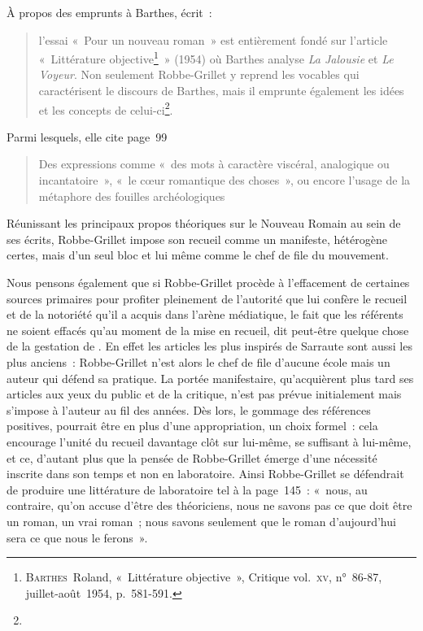 \documentclass[12pt, a4paper]{article}
\begin{document}
À propos des emprunts à Barthes, \galia{} écrit~:
\begin{quote}
l’essai «~Pour un nouveau roman~» est entièrement fondé sur l’article «~Littérature objective\footnote{\textsc{Barthes}~Roland, «~Littérature objective~», Critique vol.~\textsc{xv}, n°~86-87, juillet-août~1954, p.~581-591.}~» (1954) où Barthes analyse \textit{La Jalousie} et \textit{Le Voyeur}. Non seulement Robbe-Grillet y reprend les vocables qui caractérisent le discours de Barthes, mais il emprunte également les idées et les concepts de celui-ci\footnote{}.    
\end{quote}
Parmi lesquels, elle cite page~99
\begin{quote}
Des expressions comme «~des mots à caractère viscéral, analogique ou incantatoire~», «~le cœur romantique des choses~», ou encore l’usage de la métaphore des fouilles archéologiques
\end{quote}

Réunissant les principaux propos théoriques sur le Nouveau Romain au sein de ses écrits, Robbe-Grillet impose son recueil comme un manifeste, hétérogène certes, mais d'un seul bloc et lui même comme le chef de file du mouvement.










Nous pensons également que si Robbe-Grillet procède à l'effacement de certaines sources primaires pour profiter pleinement de l'autorité que lui confère le recueil et de la notoriété qu'il a acquis dans l'arène médiatique, le fait que les référents ne soient effacés qu'au moment de la mise en recueil, dit peut-être quelque chose de la gestation de \punr. En effet les articles les plus inspirés de Sarraute sont aussi les plus anciens~: Robbe-Grillet n'est alors le chef de file d'aucune école mais un auteur qui défend sa pratique. La portée manifestaire, qu'acquièrent plus tard ses articles aux yeux du public et de la critique, n'est pas prévue initialement mais s'impose à l'auteur au fil des années. Dès lors, le gommage des références positives, pourrait être en plus d'une appropriation, un choix formel~: cela encourage l'unité du recueil davantage clôt sur lui-même, se suffisant à lui-même, et ce, d'autant plus que la pensée de Robbe-Grillet émerge d'une nécessité inscrite dans son temps et non en laboratoire. Ainsi Robbe-Grillet se défendrait de produire une littérature de laboratoire tel à la page~145~: «~nous, au contraire, qu’on accuse d’être des théoriciens, nous ne savons pas ce que doit être un roman, un vrai roman~; nous savons seulement que le roman d’aujourd’hui sera ce que nous le ferons~».
\end{document}
